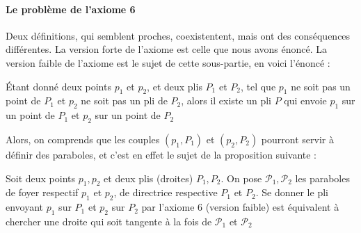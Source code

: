 \documentclass[a4paper,12pt,french,draft]{report}
\begin{document}
			\paragraph{Le problème de l'axiome 6}
			Deux définitions, qui semblent proches, coexistentent, mais ont des conséquences différentes. La version forte de l'axiome est celle que nous avons énoncé. La version faible de l'axiome est le sujet de cette sous-partie, en voici l'énoncé :
			
			\begin{axiome}
			Étant donné deux points $p_{1}$ et $p_{2}$, et deux plis $P_{1}$ et $P_{2}$, tel que $p_{1}$ ne soit pas un point de $P_{1}$ et $p_{2}$ ne soit pas un pli de $P_{2}$, alors il existe un pli $P$ qui envoie $p_{1}$ sur un point de $P_{1}$ et $p_{2}$ sur un point de $P_{2}$
			\end{axiome}
			
			Alors, on comprends que les couples $(p_{1},P_{1})$ et $(p_{2},P_{2})$ pourront servir à définir des paraboles, et c'est en effet le sujet de la proposition suivante : 
			
			\begin{proposition}
				Soit deux points $p_{1},p_{2}$ et deux plis (droites) $P_{1},P_{2}$. On pose $\mathcal{P}_{1},\mathcal{P}_{2}$ les paraboles de foyer respectif $p_{1}$ et $p_{2}$, de directrice respective $P_{1}$ et $P_{2}$. Se donner le pli envoyant $p_{1}$ sur $P_{1}$ et $p_{2}$ sur $P_{2}$ par l'axiome 6 (version faible) est équivalent à chercher une droite qui soit tangente à la fois de $\mathcal{P}_{1}$ et $\mathcal{P}_{2}$
			\end{proposition}
			
\end{document}
